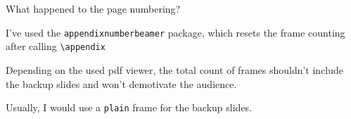 \documentclass[aspectratio=169]{beamer}
\begin{document}
\begin{frame}{What happened to the page numbering?}
  \begin{vfilleditems}
    \item I've used the \texttt{appendixnumberbeamer}
    package, which resets the frame counting after calling
    \texttt{\textbackslash{}appendix}
    \item Depending on the used pdf viewer, the total
    count of frames shouldn't include the backup slides and
    won't demotivate the audience.
    \item Usually, I would use a \texttt{plain} frame
    for the backup slides.
  \end{vfilleditems}
\end{frame}
\end{document}
